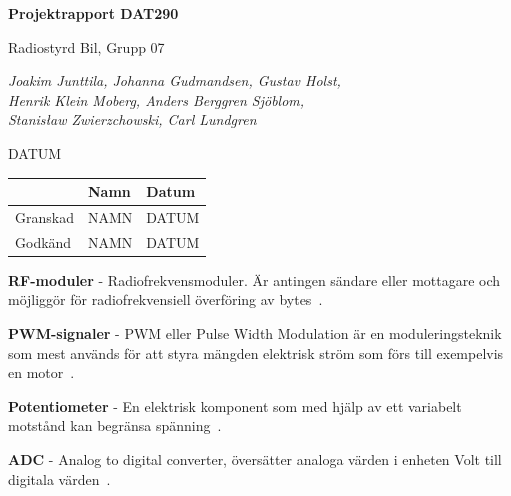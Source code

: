 \documentclass[a4paper]{article}
\begin{document}
\begin{titlepage}
\centering
{\bfseries\huge Projektrapport DAT290}

\vspace{10mm}

{\Large Radiostyrd Bil, Grupp 07}

\vspace{20mm}

{\Large \itshape{Joakim Junttila, Johanna Gudmandsen, Gustav Holst,\\Henrik Klein Moberg, Anders Berggren Sjöblom, \\[1mm] Stanisław Zwierzchowski, Carl Lundgren}}

\vspace{10mm}

{DATUM}


\normalsize{
\begin{table}[b]
\centering
\begin{tabular}{|l|l|l|}  \hline
         & \bf Namn & \bf Datum   \\ \hline \hline
Granskad & NAMN     & DATUM        \\ \hline
Godkänd  & NAMN     & DATUM         \\ \hline
\end{tabular} 
\end{table}}
\end{titlepage}

\tableofcontents

\newpage
{}

\vspace{5mm} \noindent
{\bf RF-moduler} - Radiofrekvensmoduler. Är antingen sändare eller mottagare och möjliggör för radiofrekvensiell överföring av bytes~\cite{RFModule}.

\vspace{5mm} \noindent
{\bf PWM-signaler} - PWM eller Pulse Width Modulation är en moduleringsteknik som mest används för att styra mängden elektrisk ström som förs till exempelvis en motor~\cite{PWM}.

\vspace{5mm} \noindent
{\bf Potentiometer} - En elektrisk komponent som med hjälp av ett variabelt motstånd kan begränsa spänning~\cite{Potentiometer}.

\vspace{5mm} \noindent
{\bf ADC} - Analog to digital converter, översätter analoga värden i enheten Volt till digitala värden~\cite{ADC}.
\end{document}
